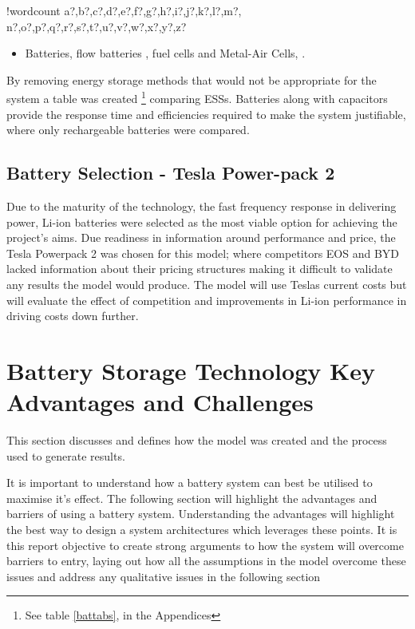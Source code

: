 \documentclass[fontsize=9.5pt]{extarticle}
\numberwithin{figure}{section} %
\providecommand{\tightlist}{%
  \setlength{\itemsep}{0pt}\setlength{\parskip}{0pt}}
\newcounter{words}
\newenvironment{counted}{%
  \setcounter{words}{0}
  \SearchList!{wordcount}{\stepcounter{words}}
    {a?,b?,c?,d?,e?,f?,g?,h?,i?,j?,k?,l?,m?,
    n?,o?,p?,q?,r?,s?,t?,u?,v?,w?,x?,y?,z?}
  \UndoBoundary{'}
  \SearchOrder{p;}}{%
  \StopSearching}
\begin{document}
\begin{counted}
\begin{itemize}
  \begin{itemize}
  \tightlist
  \item
    Batteries, flow batteries \cite{flowbatstan}, fuel cells and
    Metal-Air Cells\cite{Chen2009291}, \cite{batuni}.
  \end{itemize}
\end{itemize}

By removing energy storage methods that would not be appropriate for the
system a table was created
\footnote{See table \ref{battabs}, in the Appendices} comparing ESSs.
Batteries along with capacitors provide the response time
\cite{Choudar201521} and efficiencies required to make the system
justifiable, where only rechargeable batteries were compared.

\subsection{Battery Selection - Tesla Power-pack
2}\label{battery-selection---tesla-power-pack-2}

Due to the maturity of the technology, the fast frequency response in
delivering power, Li-ion batteries were selected as the most viable
option for achieving the project's aims. Due readiness in information
around performance and price, the Tesla Powerpack 2 was chosen for this
model; where competitors EOS and BYD lacked information about their
pricing structures making it difficult to validate any results the model
would produce. The model will use Teslas current costs but will evaluate
the effect of competition and improvements in Li-ion performance in
driving costs down further.

\section{Battery Storage Technology Key Advantages and
Challenges}\label{battery-storage-technology-key-advantages-and-challenges}

This section discusses and defines how the model was created and the
process used to generate results.

It is important to understand how a battery system can best be utilised
to maximise it's effect. The following section will highlight the
advantages and barriers of using a battery system. Understanding the
advantages will highlight the best way to design a system architectures
which leverages these points. It is this report objective to create
strong arguments to how the system will overcome barriers to entry,
laying out how all the assumptions in the model overcome these issues
and address any qualitative issues in the following section


\end{counted}
\end{document}
